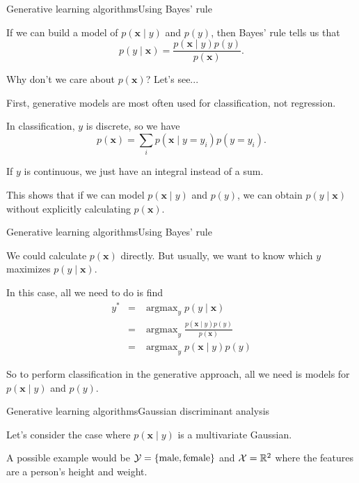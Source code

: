 \documentclass{beamer}
\renewcommand{\vec}[1]{\boldsymbol{#1}}
\def\Rset{\mathbb{R}}
\DeclareMathOperator*{\argmax}{argmax}
\begin{document}
\begin{frame}{Generative learning algorithms}{Using Bayes' rule}

  If we can build a model of $p(\vec{x} \mid y)$ and $p(y)$, then
  \alert{Bayes' rule} tells us that
  \[ p(y \mid \vec{x}) = \frac{p(\vec{x} \mid y) p(y)}{p(\vec{x})}. \]

  Why don't we care about $p(\vec{x})$?  Let's see...

  \medskip

  First, generative models are most often used for
  \alert{classification}, not regression.

  \medskip
  
  In classification, \alert{$y$ is discrete}, so we have
  \[ p(\vec{x}) = \sum_i p(\vec{x} \mid y=y_i) p(y=y_i) .\]

  \medskip

  If $y$ is continuous, we just have an integral instead of a sum.

  \medskip

  This shows that if we can model $p(\vec{x} \mid y)$ and $p(y)$,
  we can obtain $p(y \mid \vec{x})$ without explicitly calculating
  $p(\vec{x})$.

\end{frame}


\begin{frame}{Generative learning algorithms}{Using Bayes' rule}

  We could calculate $p(\vec{x})$ directly. But usually, we want to know
  \alert{which $y$ maximizes $p(y \mid \vec{x})$}.

  \medskip

  In this case, all we need to do is find
  \begin{eqnarray}
    y^* & = & \argmax_{y} p(y \mid \vec{x}) \nonumber \\
    & = & \argmax_{y} \frac{p(\vec{x} \mid y)p(y)}{p(\vec{x})} \nonumber \\
    & = & \argmax_y p(\vec{x} \mid y)p(y) \nonumber
  \end{eqnarray}

  \medskip

  So to perform classification in the generative approach, all we need
  is models for $p(\vec{x} \mid y)$ and $p(y)$.
  
\end{frame}


\begin{frame}{Generative learning algorithms}{Gaussian discriminant analysis}

  Let's consider the case where $p(\vec{x} \mid y)$ is a
  \alert{multivariate Gaussian}.

  \medskip

  A possible example would be ${\cal Y} = \{ \text{male},
  \text{female} \}$ and ${\cal X} = \Rset^2$ where the features are a
  person's height and weight.

\end{frame}
\end{document}
